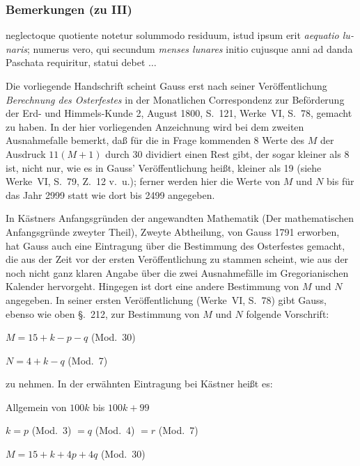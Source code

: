 \documentclass[12pt,a4paper]{article}
\theoremstyle{plain}
\theoremstyle{definition}
\theoremstyle{remark}
\begin{document}
\newpage

\subsubsection*{Bemerkungen (zu III)}

\begin{otherlanguage}{latin}
neglectoque quotiente notetur solummodo residuum, istud ipsum erit \textit{aequatio lunaris}; numerus vero, qui secundum \textit{menses lunares} initio cujusque anni ad danda Paschata requiritur, statui debet $\dots$
\end{otherlanguage}

Die vorliegende Handschrift scheint Gauss erst nach seiner Veröffentlichung \textit{Berechnung des Osterfestes} in der Monatlichen Correspondenz zur Beförderung der Erd- und Himmels-Kunde 2, August 1800, S.~121, Werke~VI, S.~78, gemacht zu haben. In der hier vorliegenden Anzeichnung wird bei dem zweiten Ausnahmefalle bemerkt, daß für die in Frage kommenden 8 Werte des $M$ der Ausdruck $11(M + 1)$ durch 30 dividiert einen Rest gibt, der sogar kleiner als 8 ist, nicht nur, wie es in Gauss' Veröffentlichung heißt, kleiner als 19 (siehe Werke~VI, S.~79, Z.~12 v.~u.); ferner werden hier die Werte von $M$ und $N$ bis für das Jahr 2999 statt wie dort bis 2499 angegeben.

In Kästners Anfangsgründen der angewandten Mathematik (Der mathematischen Anfangsgründe zweyter Theil), Zweyte Abtheilung, von Gauss 1791 erworben, hat Gauss auch eine Eintragung über die Bestimmung des Osterfestes gemacht, die aus der Zeit vor der ersten Veröffentlichung zu stammen scheint, wie aus der noch nicht ganz klaren Angabe über die zwei Ausnahmefälle im Gregorianischen Kalender hervorgeht. Hingegen ist dort eine andere Bestimmung von $M$ und $N$ angegeben. In seiner ersten Veröffentlichung (Werke~VI, S.~78) gibt Gauss, ebenso wie oben §.~212, zur Bestimmung von $M$ und $N$ folgende Vorschrift:

\null\quad $M = 15 + k - p - q$ (Mod.~30)

\null\quad $N = 4 + k - q$ (Mod.~7)

zu nehmen. In der erwähnten Eintragung bei Kästner heißt es:

\null\quad Allgemein von $100k$ bis $100k + 99$

\null\quad $k = p$ (Mod.~3) $= q$ (Mod.~4) $= r$ (Mod.~7)

\null\quad $M = 15 + k + 4p + 4q$ (Mod.~30)
\end{document}
